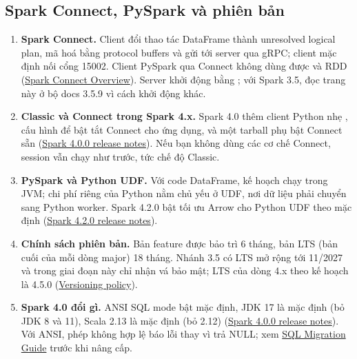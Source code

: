 \subsection{Spark Connect, PySpark và phiên bản}
\begin{enumerate}[resume]
  \item \textbf{Spark Connect.} Client đổi thao tác DataFrame thành unresolved logical plan, mã hoá bằng protocol buffers và gửi tới server qua gRPC; client mặc định nối cổng 15002. Client PySpark qua Connect không dùng được  và RDD (\href{https://spark.apache.org/docs/latest/spark-connect-overview.html}{Spark Connect Overview}). Server khởi động bằng ; với Spark 3.5, đọc trang này ở bộ docs 3.5.9 vì cách khởi động khác.
  \item \textbf{Classic và Connect trong Spark 4.x.} Spark 4.0 thêm client Python nhẹ , cấu hình  để bật tắt Connect cho ứng dụng, và một tarball phụ bật Connect sẵn (\href{https://spark.apache.org/releases/spark-release-4-0-0.html}{Spark 4.0.0 release notes}). Nếu bạn không dùng các cơ chế Connect, session vẫn chạy như trước, tức chế độ Classic.
  \item \textbf{PySpark và Python UDF.} Với code DataFrame, kế hoạch chạy trong JVM; chi phí riêng của Python nằm chủ yếu ở UDF, nơi dữ liệu phải chuyển sang Python worker. Spark 4.2.0 bật tối ưu Arrow cho Python UDF theo mặc định (\href{https://spark.apache.org/releases/spark-release-4-2-0.html}{Spark 4.2.0 release notes}).
  \item \textbf{Chính sách phiên bản.} Bản feature được bảo trì 6 tháng, bản LTS (bản cuối của mỗi dòng major) 18 tháng. Nhánh 3.5 có LTS mở rộng tới 11/2027 và trong giai đoạn này chỉ nhận vá bảo mật; LTS của dòng 4.x theo kế hoạch là 4.5.0 (\href{https://spark.apache.org/versioning-policy.html}{Versioning policy}).
  \item \textbf{Spark 4.0 đổi gì.} ANSI SQL mode bật mặc định, JDK 17 là mặc định (bỏ JDK 8 và 11), Scala 2.13 là mặc định (bỏ 2.12) (\href{https://spark.apache.org/releases/spark-release-4-0-0.html}{Spark 4.0.0 release notes}). Với ANSI, phép  không hợp lệ báo lỗi thay vì trả NULL; xem \href{https://spark.apache.org/docs/latest/sql-migration-guide.html}{SQL Migration Guide} trước khi nâng cấp.
\end{enumerate}

